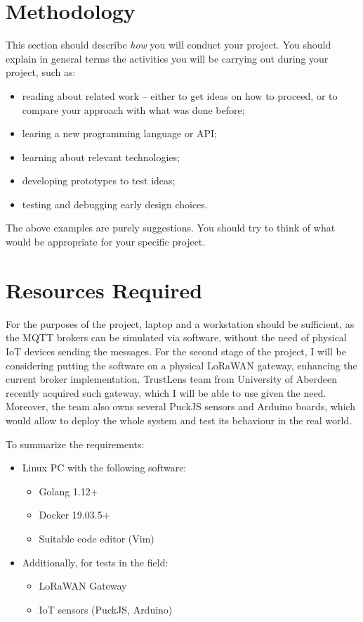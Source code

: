 \documentclass[a4paper,12pt]{article}
\begin{document}
\section*{Methodology}

This section should describe {\em how} you will conduct
your project. You should explain in general terms
the activities you will be carrying out during your project, such as:
%
\begin{itemize}
\item reading about related work -- either to get ideas on how to
      proceed, or to compare your approach with what was done before;
\item learing a new programming language or API;
\item learning about relevant technologies;
\item developing prototypes to test ideas;
\item testing and debugging early design choices.
\end{itemize}
%
The above examples are purely suggestions. You should try to think
of what would be appropriate for your specific project.

\section*{Resources Required}

For the purposes of the project, laptop and a workstation should be sufficient, as the MQTT brokers can be simulated via software, without the need of physical IoT devices sending the messages. For the second stage of the project, I will be considering putting the software on a physical LoRaWAN gateway, enhancing the current broker implementation. TrustLens team from University of Aberdeen recently acquired such gateway, which I will be able to use given the need. Moreover, the team also owns several PuckJS sensors and Arduino boards, which would allow to deploy the whole system and test its behaviour in the real world.

To summarize the requirements:
\begin{itemize}
  \item Linux PC with the following software: 
    \begin{itemize}
      \item Golang 1.12+ 
      \item Docker 19.03.5+
      \item Suitable code editor (Vim)
    \end{itemize}
  \item Additionally, for tests in the field:
    \begin{itemize}
      \item LoRaWAN Gateway
      \item IoT sensors (PuckJS, Arduino) 
    \end{itemize}
\end{itemize}
\end{document}
